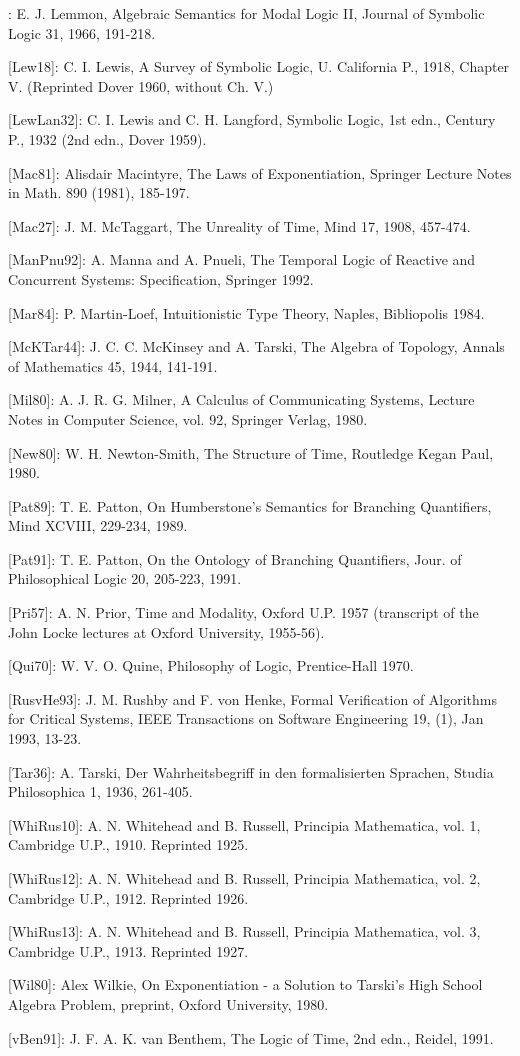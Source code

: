 \begin{spec}
[Lem66b]: E. J. Lemmon, Algebraic Semantics for Modal Logic II,
Journal of Symbolic Logic 31, 1966, 191-218.

[Lew18]: C. I. Lewis, A Survey of Symbolic Logic, U. California P.,
1918, Chapter V. (Reprinted Dover 1960, without Ch. V.)

[LewLan32]: C. I. Lewis and C. H. Langford, Symbolic Logic, 1st
edn., Century P., 1932 (2nd edn., Dover 1959).

[Mac81]: Alisdair Macintyre, The Laws of Exponentiation, Springer
Lecture Notes in Math. 890 (1981), 185-197.

[Mac27]: J. M. McTaggart, The Unreality of Time, Mind 17, 1908,
457-474.

[ManPnu92]: A. Manna and A. Pnueli, The Temporal Logic of Reactive
and Concurrent Systems: Specification, Springer 1992.

[Mar84]: P. Martin-Loef, Intuitionistic Type Theory, Naples,
Bibliopolis 1984.

[McKTar44]: J. C. C. McKinsey and A. Tarski, The Algebra of Topology,
Annals of Mathematics 45, 1944, 141-191.

[Mil80]: A. J. R. G. Milner, A Calculus of Communicating Systems,
Lecture Notes in Computer Science, vol. 92, Springer Verlag, 1980.

[New80]: W. H. Newton-Smith, The Structure of Time, Routledge Kegan
Paul, 1980.

[Pat89]: T. E. Patton, On Humberstone's Semantics for Branching
Quantifiers, Mind XCVIII, 229-234, 1989.

[Pat91]: T. E. Patton, On the Ontology of Branching Quantifiers,
Jour. of Philosophical Logic 20, 205-223, 1991.

[Pri57]: A. N. Prior, Time and Modality, Oxford U.P. 1957
(transcript of the John Locke lectures at Oxford University,
1955-56).

[Qui70]: W. V. O. Quine, Philosophy of Logic, Prentice-Hall 1970.

[RusvHe93]: J. M. Rushby and F. von Henke, Formal Verification of
Algorithms for Critical Systems, IEEE Transactions on Software
Engineering 19, (1), Jan 1993, 13-23.

[Tar36]: A. Tarski, Der Wahrheitsbegriff in den formalisierten
Sprachen, Studia Philosophica 1, 1936, 261-405.

[WhiRus10]: A. N. Whitehead and B. Russell, Principia Mathematica,
vol. 1, Cambridge U.P., 1910. Reprinted 1925.

[WhiRus12]: A. N. Whitehead and B. Russell, Principia Mathematica,
vol. 2, Cambridge U.P., 1912. Reprinted 1926.

[WhiRus13]: A. N. Whitehead and B. Russell, Principia Mathematica,
vol. 3, Cambridge U.P., 1913. Reprinted 1927.

[Wil80]: Alex Wilkie, On Exponentiation - a Solution to Tarski's
High School Algebra Problem, preprint, Oxford University, 1980.

[vBen91]: J. F. A. K. van Benthem, The Logic of Time, 2nd edn.,
Reidel, 1991.

\end{spec}


